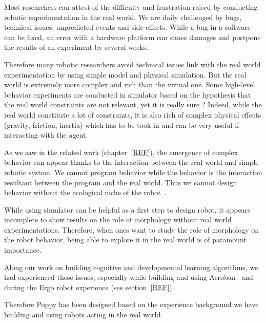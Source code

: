Most researchers can attest of the difficulty and frustration raised by conducting robotic experimentation in the real world. We are daily challenged by bugs, technical issues, unpredicted events and side effects. While a bug in a software can be fixed, an error with a hardware platform can cause damages and postpone the results of an experiment by several weeks.

Therefore many robotic researchers avoid technical issues link with the real world experimentation by using simple model and physical simulation. But the real world is extremely more complex and rich than the virtual one.
Some high-level behavior experiments are conducted in simulator based on the hypothesis that the real world constraints are not relevant, yet it is really sure ?
Indeed, while the real world constitute a lot of constraints, it is also rich of complex physical effects (gravity, friction, inertia) which has to be took in and can be very useful if interacting with the agent.

As we saw in the related work (chapter~\ref{REF}), the emergence of complex behavior can appear thanks to the interaction between the real world and simple robotic system. We cannot program behavior while the behavior is the interaction resultant between the program and the real world. Thus we cannot design behavior without the ecological niche of the robot~\cite{Steels1991emergence}.

While using simulator can be helpful as a first step to design robot, it appears incomplete to show results on the role of morphology without real world experimentations.
Therefore, when ones want to study the role of morphology on the robot behavior, being able to explore it in the real world is of paramount importance.

Along our work on building cognitive and developmental learning algorithms, we had experienced these issues, especially while building and using Acroban~\cite{Ly2010} and during the Ergo robot experience (see section~\ref{REF}).

Therefore Poppy has been designed based on the experience background we have building and using robots acting in the real world.

